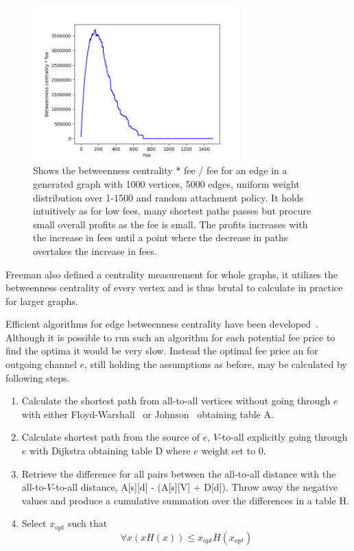 \begin{figure}[!htb]

	\centering
	\includegraphics[width=8cm]{images/fee_curve.png}
	\caption{ Shows the betweenness centrality * fee / fee for an edge in a generated graph with 1000 vertices, 5000 edges, uniform weight distribution over 1-1500 and random attachment policy. It holds intuitively as for low fees, many shortest paths passes but procure small overall profits as the fee is small. The profits increases with the increase in fees until a point where the decrease in paths overtakes the increase in fees.
	}
	\label{fig:fee_curve}

\end{figure}

Freeman also defined a centrality measurement for whole graphs, it utilizes the betweenness centrality of every vertex and is thus brutal to calculate in practice for larger graphs. 

Efficient algorithms for edge betweenness centrality have been developed~\cite{brandes:betweenness:centrality:algorithm}. Although it is possible to run such an algorithm for each potential fee price to find the optima it would be very slow.
Instead the optimal fee price an for outgoing channel $e$, still holding the assumptions as before, may be calculated by following steps.

\newpage

\begin{enumerate}
	\item Calculate the shortest \gls{path} from all-to-all vertices without going through $e$ with either Floyd-Warshall~\cite{bakhtiar:floyd:warshall} or Johnson~\cite{johnson:shortest:path:sparse:network} obtaining table A.
	\item Calculate shortest path from the source of $e$, $V$-to-all explicitly going through $e$ with Dijkstra obtaining table D where $e$ weight set to 0.
	\item Retrieve the difference for all pairs between the all-to-all distance with the all-to-$V$-to-all distance, A[s][d] - (A[s][V] + D[d]). Throw away the negative values and produce a cumulative summation over the differences in a table H.
	\item Select $x_{opt}$ such that \[ \forall x (x H(x)) \leq x_{opt} H(x_{opt}) \]

\end{enumerate} 

